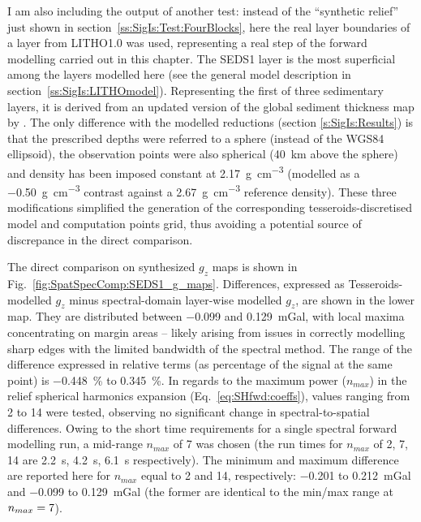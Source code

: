 \begin{subappendices}
I am also including the output of another test: instead of the ``synthetic relief'' just shown in section~\ref{ss:SigIs:Test:FourBlocks}, here the real layer boundaries of a layer from LITHO1.0 \parencite{Pasyanos2014} was used, representing a real step of the forward modelling carried out in this chapter.
The {SEDS1} layer is the most superficial among the layers modelled here (see the general model description in section~\ref{ss:SigIs:LITHOmodel}).
Representing the first of three sedimentary layers, it is derived from an updated version of the global sediment thickness map by \textcite{Laske1997_sediments}.
The only difference with the modelled reductions (section \ref{s:SigIs:Results}) is that the prescribed depths were referred to a sphere (instead of the WGS84 ellipsoid), the observation points were also spherical (\SI{40}{\kilo \metre} above the sphere) and density has been imposed constant at \SI{2.17}{\gram \per \cubic \centi \metre} (modelled as a \SI{-0.50}{\gram \per \cubic \centi \metre} contrast against a \SI{2.67}{\gram \per \cubic \centi \metre} reference density).
These three modifications simplified the generation of the corresponding tesseroids-discretised model and computation points grid, thus avoiding a potential source of discrepance in the direct comparison.

The direct comparison on synthesized $g_z$ maps is shown in Fig.~\ref{fig:SpatSpecComp:SEDS1_g_maps}.
Differences, expressed as Tesseroids-modelled $g_z$ minus spectral-domain layer-wise modelled $g_z$, are shown in the lower map.
They are distributed between \num{-0.099} and \SI{0.129}{\milli Gal}, with local maxima concentrating on margin areas -- likely arising from issues in correctly modelling sharp edges with the limited bandwidth of the spectral method.
The range of the difference expressed in relative terms (as percentage of the signal at the same point) is \SI{-0.448}{\percent} to \SI{0.345}{\percent}.
In regards to the maximum power ($n_{max}$) in the relief spherical harmonics expansion (Eq.~\ref{eq:SHfwd:coeffs}), values ranging from \num{2} to \num{14} were tested, observing no significant change in spectral-to-spatial differences.
Owing to the short time requirements for a single spectral forward modelling run, a mid-range $n_{max}$ of 7 was chosen (the run times for $n_{max}$ of 2, 7, 14 are \SI{2.2}{s}, \SI{4.2}{s}, \SI{6.1}{s} respectively).
The minimum and maximum difference are reported here for $n_{max}$ equal to 2 and 14, respectively: \num{-0.201} to \SI{0.212}{\milli Gal} and \num{-0.099} to \SI{0.129}{\milli Gal} (the former are identical to the min/max range at $n_{max}=\textrm{\num{7}}$).


\end{subappendices}
